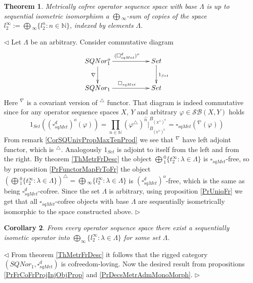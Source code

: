 \documentclass[12pt]{article}
\newtheorem{theorem}{Theorem}[subsection]
\newtheorem{corollary}[theorem]{Corollary}
\newenvironment{proof}{\par $\triangleleft$}{$\triangleright$}
\begin{document}
\begin{theorem}\label{ThMetCoFrDesc}
Metrically cofree operator sequence space with base $\Lambda$ is up to sequential isometric isomorphism  a $\bigoplus{}_\infty$-sum of copies of the space $l_2^\infty:=\bigoplus{}_\infty\{l_2^n:n\in\mathbb{N}\}$, indexed by elements $\Lambda$.
\end{theorem}
\begin{proof}
Let $\Lambda$ be an arbitrary. Consider commutative diagram
$$
\xymatrix{
SQNor_1^o \ar[d]_{\nabla } \ar[rr]^{(\square_{sqMet}^{d})^o} & & {Set}\ar[d]^{1_{Set}}\\
SQNor_1\ar[rr]^{\square_{sqMet}}&  &{Set}}
$$
Here ${}^\nabla$ is a covariant version of ${}^\triangle$ functor. That diagram is indeed commutative since for any operator sequence spaces $X$, $Y$ and arbitrary $\varphi\in\mathcal{SB}(X,Y)$ holds
$$
1_{Set}((\square_{sqMet}^d)^o(\varphi))
=\prod\limits_{n\in\mathbb{N}} (\varphi^\triangle )^{\wideparen{n}}|_{B_{(Y^\triangle )^{\wideparen{n}}}}^{B_{(X^\triangle )^{\wideparen{n}}}}
=\square_{sqMet}({}^\nabla(\varphi))
$$
From remark \ref{CorSQUnivPropMaxTenProd} we see that ${}^\nabla$ have left adjoint functor, which is  ${}^\triangle$. Analogously $1_{Set}$ is adjoint to itself from the left and from the right. 
By theorem \ref{ThMetrFrDesc} the object $\bigoplus{}_1^0\{t_2^\infty:\lambda\in\Lambda\}$ is  $\square_{sqMet}$-free, so by proposition \ref{PrFunctorMapFrToFr} the object 
$(\bigoplus{}_1^0\{t_2^\infty:\lambda\in\Lambda\})^\triangle=\bigoplus{}_\infty\{l_2^\infty:\lambda\in\Lambda\}$ is $(\square_{sqMet}^d)^o$-free, which is the same as being $\square_{sqMet}^d$-cofree. Since the set $\Lambda$ is arbitrary, using proposition \ref{PrUniqFr} we get that all $\square_{sqMet}$-cofree objects with base $\Lambda$ are sequentially isometrically isomorphic to the space constructed above.
\end{proof}

\begin{corollary}\label{CorSQSpaceIsFromMetrAdmMonoMorph}
From every operator sequence space there exist a sequentially isometic operator into $\bigoplus_\infty\{l_2^\infty:\lambda\in\Lambda\}$  for some set $\Lambda$.
\end{corollary}
\begin{proof}
From theorem \ref{ThMetrFrDesc} it follows that the rigged category $(SQNor_1,\square_{sqMet}^d)$ is cofreedom-loving. Now the desired result from propositions \ref{PrFrCoFrProjInjObjProp} and \ref{PrDecsMetrAdmMonoMorph}.
\end{proof}
\end{document}
